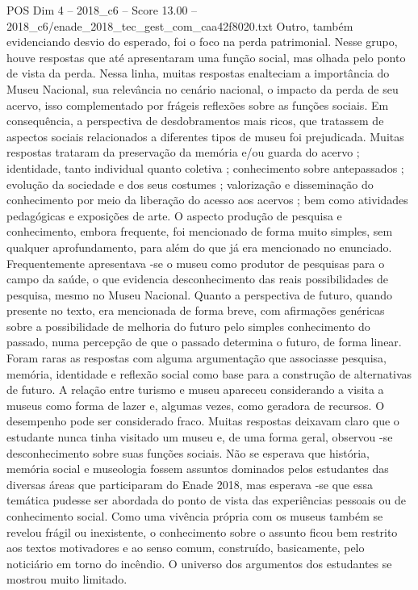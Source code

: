 \begin{textsample}{POS Dim 4 – 2018\_c6 – Score 13.00 – 2018\_c6/enade\_2018\_tec\_gest\_com\_caa42f8020.txt}
Outro, também evidenciando desvio do esperado, foi o foco na perda patrimonial.
Nesse grupo, houve respostas que até apresentaram uma função social, mas olhada pelo ponto de vista da perda.
Nessa linha, muitas respostas enalteciam a importância do Museu Nacional, sua relevância no cenário nacional, o impacto da perda de seu acervo, isso complementado por frágeis reflexões sobre as funções sociais.
Em consequência, a perspectiva de desdobramentos mais ricos, que tratassem de aspectos sociais relacionados a diferentes tipos de museu foi prejudicada.
Muitas respostas trataram da preservação da memória e/ou guarda do acervo ; identidade, tanto individual quanto coletiva ; conhecimento sobre antepassados ; evolução da sociedade e dos seus costumes ; valorização e disseminação do conhecimento por meio da liberação do acesso aos acervos ; bem como atividades pedagógicas e exposições de arte.
O aspecto produção de pesquisa e conhecimento, embora frequente, foi mencionado de forma muito simples, sem qualquer aprofundamento, para além do que já era mencionado no enunciado.
Frequentemente apresentava -se o museu como produtor de pesquisas para o campo da saúde, o que evidencia desconhecimento das reais possibilidades de pesquisa, mesmo no Museu Nacional.
Quanto a perspectiva de futuro, quando presente no texto, era mencionada de forma breve, com afirmações genéricas sobre a possibilidade de melhoria do futuro pelo simples conhecimento do passado, numa percepção de que o passado determina o futuro, de forma linear.
Foram raras as respostas com alguma argumentação que associasse pesquisa, memória, identidade e reflexão social como base para a construção de alternativas de futuro.
A relação entre turismo e museu apareceu considerando a visita a museus como forma de lazer e, algumas vezes, como geradora de recursos.
O desempenho pode ser considerado fraco.
Muitas respostas deixavam claro que o estudante nunca tinha visitado um museu e, de uma forma geral, observou -se desconhecimento sobre suas funções sociais.
Não se esperava que história, memória social e museologia fossem assuntos dominados pelos estudantes das diversas áreas que participaram do Enade 2018, mas esperava -se que essa temática pudesse ser abordada do ponto de vista das experiências pessoais ou de conhecimento social.
Como uma vivência própria com os museus também se revelou frágil ou inexistente, o conhecimento sobre o assunto ficou bem restrito aos textos motivadores e ao senso comum, construído, basicamente, pelo noticiário em torno do incêndio.
O universo dos argumentos dos estudantes se mostrou muito limitado.

\end{textsample}
